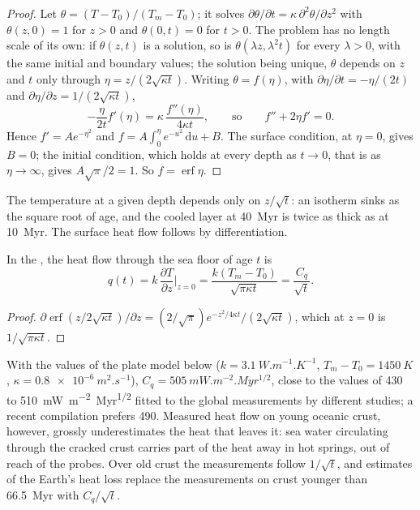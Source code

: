 \begin{proof}
Let $\theta = (T - T_0)/(T_m - T_0)$; it solves $\partial\theta/\partial t =
\kappa\,\partial^2\theta/\partial z^2$ with $\theta(z, 0) = 1$ for $z > 0$ and
$\theta(0, t) = 0$ for $t > 0$. The problem has no length scale of its own:
if $\theta(z, t)$ is a solution, so is $\theta(\lambda z, \lambda^2t)$ for every
$\lambda > 0$, with the same initial and boundary values; the solution being
unique, $\theta$ depends on $z$ and $t$ only through $\eta = z/(2\sqrt{\kappa
t})$. Writing $\theta = f(\eta)$, with $\partial\eta/\partial t = -\eta/(2t)$ and
$\partial\eta/\partial z = 1/(2\sqrt{\kappa t})$,
\[
  -\frac{\eta}{2t}f'(\eta) = \kappa\,\frac{f''(\eta)}{4\kappa t},
  \qquad\text{so}\qquad f'' + 2\eta f' = 0 .
\]
Hence $f' = Ae^{-\eta^2}$ and $f = A\int_0^\eta e^{-u^2}\,\mathrm du + B$. The
surface condition, at $\eta = 0$, gives $B = 0$; the initial condition, which
holds at every depth as $t \to 0$, that is as $\eta \to \infty$, gives
$A\sqrt\pi/2 = 1$. So $f = \operatorname{erf}\eta$.
\end{proof}

The temperature at a given depth depends only on $z/\sqrt t$: an isotherm sinks
as the square root of age, and the cooled layer at \qty{40}{Myr} is twice as
thick as at \qty{10}{Myr}. The surface heat flow follows by differentiation.

\begin{proposition}\label{prop:b3:lithosphere-thermal-models:heat-flow}
In the , the heat flow through the sea floor of age $t$
is
\[
  q(t) = k\,\frac{\partial T}{\partial z}\Big|_{z=0}
  = \frac{k(T_m - T_0)}{\sqrt{\pi\kappa t}} = \frac{C_q}{\sqrt t} .
\]
\end{proposition}

\begin{proof}
$\partial\operatorname{erf}(z/2\sqrt{\kappa t})/\partial z = (2/\sqrt\pi)
e^{-z^2/4\kappa t}/(2\sqrt{\kappa t})$, which at $z = 0$ is $1/\sqrt{\pi\kappa
t}$.
\end{proof}

With the values of the plate model below ($k = \qty{3.1}{W.m^{-1}.K^{-1}}$,
$T_m - T_0 = \qty{1450}{K}$, $\kappa = \qty{0.8e-6}{m^2.s^{-1}}$), $C_q =
\qty{505}{mW.m^{-2}.Myr^{1/2}}$, close to the values of 430 to
\qty{510}{mW.m^{-2}.Myr^{1/2}} fitted to the global measurements by different
studies; a recent compilation prefers \num{490}. Measured heat flow on young
oceanic crust, however, grossly underestimates the heat that leaves it:
sea water circulating through the cracked crust carries part of the heat away
in hot springs, out of reach of the probes. Over old crust the measurements
follow $1/\sqrt t$, and estimates of the Earth's heat loss replace the
measurements on crust younger than \qty{66.5}{Myr} with $C_q/\sqrt t$.

